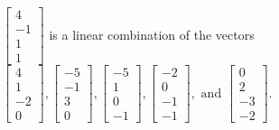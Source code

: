 \begin{exercise}
\begin{exerciseStatement}
  \end{exerciseStatement}
  \begin{exerciseAnswer}
   \(\left[\begin{array}{c}
4 \\
-1 \\
1 \\
1
\end{array}\right]\) 
  	 is  
	a linear combination of the vectors \(\left[\begin{array}{c}
4 \\
1 \\
-2 \\
0
\end{array}\right] , \left[\begin{array}{c}
-5 \\
-1 \\
3 \\
0
\end{array}\right] , \left[\begin{array}{c}
-5 \\
1 \\
0 \\
-1
\end{array}\right] , \left[\begin{array}{c}
-2 \\
0 \\
-1 \\
-1
\end{array}\right] , \text{ and } \left[\begin{array}{c}
0 \\
2 \\
-3 \\
-2
\end{array}\right]\).

	
  


  \end{exerciseAnswer}
\end{exercise}